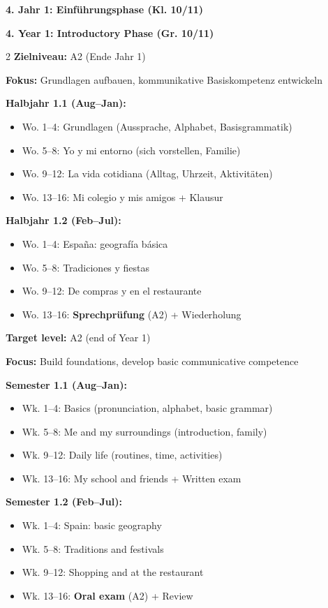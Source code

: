 \documentclass[10pt,a4paper]{article}
\newcommand{\secbil}[2]{%
\vspace{6pt}
\noindent\colorbox{spaet}{\parbox{0.48\textwidth}{\color{white}\bfseries\small #1}}%
\hfill%
\colorbox{english}{\parbox{0.48\textwidth}{\color{white}\bfseries\small #2}}
\vspace{3pt}
}
\begin{document}
\newpage

\secbil{4. Jahr 1: Einführungsphase (Kl. 10/11)}{4. Year 1: Introductory Phase (Gr. 10/11)}

\begin{paracol}{2}
\small
\textbf{Zielniveau:} A2 (Ende Jahr 1)\footnotemark[5]
\par\vspace{1mm}
\textbf{Fokus:} Grundlagen aufbauen, kommunikative Basiskompetenz entwickeln

\textbf{Halbjahr 1.1 (Aug--Jan):}
\begin{itemize}[noitemsep,topsep=2pt]
\item Wo. 1--4: Grundlagen (Aussprache, Alphabet, Basisgrammatik)
\item Wo. 5--8: Yo y mi entorno (sich vorstellen, Familie)
\item Wo. 9--12: La vida cotidiana (Alltag, Uhrzeit, Aktivitäten)
\item Wo. 13--16: Mi colegio y mis amigos + Klausur
\end{itemize}

\textbf{Halbjahr 1.2 (Feb--Jul):}
\begin{itemize}[noitemsep,topsep=2pt]
\item Wo. 1--4: España: geografía básica
\item Wo. 5--8: Tradiciones y fiestas
\item Wo. 9--12: De compras y en el restaurante
\item Wo. 13--16: \textbf{Sprechprüfung} (A2) + Wiederholung
\end{itemize}

\switchcolumn

\small\color{english}
\textbf{Target level:} A2 (end of Year 1)\footnotemark[5]
\par\vspace{1mm}
\textbf{Focus:} Build foundations, develop basic communicative competence

\textbf{Semester 1.1 (Aug--Jan):}
\begin{itemize}[noitemsep,topsep=2pt]
\item Wk. 1--4: Basics (pronunciation, alphabet, basic grammar)
\item Wk. 5--8: Me and my surroundings (introduction, family)
\item Wk. 9--12: Daily life (routines, time, activities)
\item Wk. 13--16: My school and friends + Written exam
\end{itemize}

\textbf{Semester 1.2 (Feb--Jul):}
\begin{itemize}[noitemsep,topsep=2pt]
\item Wk. 1--4: Spain: basic geography
\item Wk. 5--8: Traditions and festivals
\item Wk. 9--12: Shopping and at the restaurant
\item Wk. 13--16: \textbf{Oral exam} (A2) + Review
\end{itemize}

\end{paracol}
\end{document}
